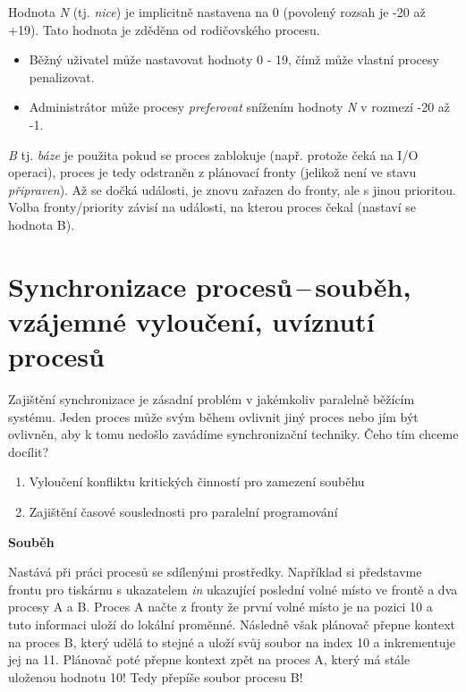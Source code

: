\vspace{0,5cm}

Hodnota \textit{N} (tj. \textit{nice}) je implicitně nastavena na 0 (povolený rozsah je -20 až +19). Tato hodnota je zděděna od rodičovského procesu.

\begin{itemize}
    \item Běžný uživatel může nastavovat hodnoty 0 - 19, čímž může vlastní procesy penalizovat.
    \item Administrátor může procesy \textit{preferovat} snížením hodnoty \textit{N} v rozmezí -20 až -1.
\end{itemize}

\vspace{0,5cm}

\textit{B} tj. \textit{báze} je použita pokud se proces zablokuje (např. protože čeká na I/O operaci), proces je tedy odstraněn z plánovací fronty (jelikož není ve stavu \textit{připraven}). Až se dočká události, je znovu zařazen do fronty, ale s jinou prioritou. Volba fronty/priority závisí na události, na kterou proces čekal (nastaví se hodnota B).

\newpage
\section{Synchronizace procesů\,--\,souběh, vzájemné vyloučení, uvíznutí procesů} \label{sync}

Zajištění synchronizace je zásadní problém v jakémkoliv paralelně běžícím systému. Jeden proces může svým během ovlivnit jiný proces nebo jím být ovlivněn, aby k tomu nedošlo zavádíme synchronizační techniky. Čeho tím chceme docílit? 
\begin{enumerate}
    \item Vyloučení konfliktu kritických činností pro zamezení souběhu
    \item Zajištění časové souslednosti pro paralelní programování
\end{enumerate}

\begin{Large}
    \vspace{0,5cm}
    \textbf{Souběh}
\end{Large}

Nastává při práci procesů se sdílenými prostředky. Například si představme frontu pro tiskárnu s ukazatelem \textit{in} ukazující poslední volné místo ve frontě a dva procesy A a B. Proces A načte z fronty že první volné místo je na pozici 10 a tuto informaci uloží do lokální proměnné. Následně však plánovač přepne kontext na proces B, který udělá to stejné a uloží svůj soubor na index 10 a inkrementuje jej na 11. Plánovač poté přepne kontext zpět na proces A, který má stále uloženou hodnotu 10! Tedy přepíše soubor procesu B! 

